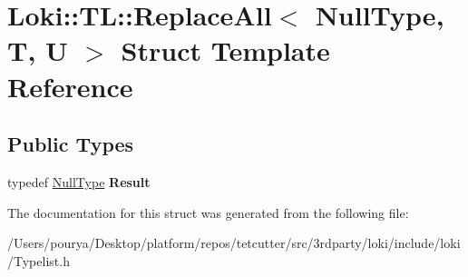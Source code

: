 \hypertarget{structLoki_1_1TL_1_1ReplaceAll_3_01NullType_00_01T_00_01U_01_4}{}\section{Loki\+:\+:T\+L\+:\+:Replace\+All$<$ Null\+Type, T, U $>$ Struct Template Reference}
\label{structLoki_1_1TL_1_1ReplaceAll_3_01NullType_00_01T_00_01U_01_4}
\subsection*{Public Types}
\begin{DoxyCompactItemize}
\item 
\hypertarget{structLoki_1_1TL_1_1ReplaceAll_3_01NullType_00_01T_00_01U_01_4_afc14050d928b870cfe1a10ee49c4d81e}{}typedef \hyperlink{classLoki_1_1NullType}{Null\+Type} {\bfseries Result}\label{structLoki_1_1TL_1_1ReplaceAll_3_01NullType_00_01T_00_01U_01_4_afc14050d928b870cfe1a10ee49c4d81e}

\end{DoxyCompactItemize}


The documentation for this struct was generated from the following file\+:\begin{DoxyCompactItemize}
\item 
/\+Users/pourya/\+Desktop/platform/repos/tetcutter/src/3rdparty/loki/include/loki/Typelist.\+h\end{DoxyCompactItemize}
